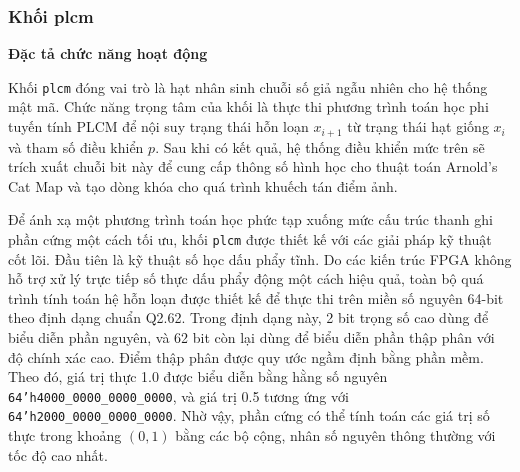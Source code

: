 

\subsubsection{Khối plcm}
\textbf{Đặc tả chức năng hoạt động}

Khối \texttt{plcm} đóng vai trò là hạt nhân sinh chuỗi số giả ngẫu nhiên cho hệ thống mật mã. Chức năng trọng tâm của khối là thực thi phương trình toán học phi tuyến tính PLCM để nội suy trạng thái hỗn loạn $x_{i+1}$ từ trạng thái hạt giống $x_i$ và tham số điều khiển $p$. Sau khi có kết quả, hệ thống điều khiển mức trên sẽ trích xuất chuỗi bit này để cung cấp thông số hình học cho thuật toán Arnold's Cat Map và tạo dòng khóa cho quá trình khuếch tán điểm ảnh.

Để ánh xạ một phương trình toán học phức tạp xuống mức cấu trúc thanh ghi phần cứng một cách tối ưu, khối \texttt{plcm} được thiết kế với các giải pháp kỹ thuật cốt lõi. Đầu tiên là kỹ thuật số học dấu phẩy tĩnh. Do các kiến trúc FPGA không hỗ trợ xử lý trực tiếp số thực dấu phẩy động một cách hiệu quả, toàn bộ quá trình tính toán hệ hỗn loạn được thiết kế để thực thi trên miền số nguyên 64-bit theo định dạng chuẩn Q2.62. Trong định dạng này, 2 bit trọng số cao dùng để biểu diễn phần nguyên, và 62 bit còn lại dùng để biểu diễn phần thập phân với độ chính xác cao. Điểm thập phân được quy ước ngầm định bằng phần mềm. Theo đó, giá trị thực 1.0 được biểu diễn bằng hằng số nguyên \texttt{64'h4000\_0000\_0000\_0000}, và giá trị 0.5 tương ứng với \texttt{64'h2000\_0000\_0000\_0000}. Nhờ vậy, phần cứng có thể tính toán các giá trị số thực trong khoảng $(0, 1)$ bằng các bộ cộng, nhân số nguyên thông thường với tốc độ cao nhất.


